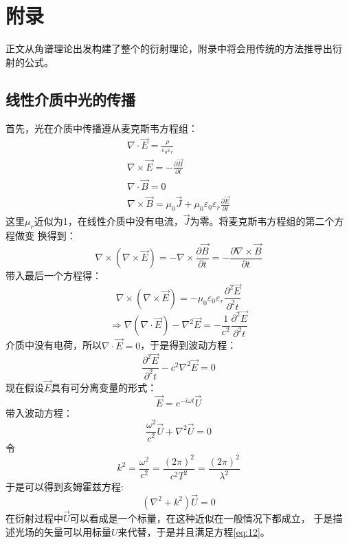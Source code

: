 \documentclass{article}
\begin{document}
\section{附录}
正文从角谱理论出发构建了整个的衍射理论，附录中将会用传统的方法推导出衍
射的公式。
\subsection{线性介质中光的传播}
首先，光在介质中传播遵从麦克斯韦方程组：
\begin{equation}
  \label{eq:11}
  \begin{array}{l}
    \nabla \cdot \vec{E}=\frac{\rho}{\varepsilon_0\varepsilon_{r}}\\
    \nabla \times \vec{E}=-\frac{\partial \vec{B}}{\partial t}\\
    \nabla \cdot \vec{B}=0\\
    \nabla \times \vec{B}=\mu_0\vec{J}+\mu_0\varepsilon_0\varepsilon_r
    \frac{\partial \vec{E}}{\partial t}
  \end{array}
\end{equation}
这里$\mu_r$近似为1，在线性介质中没有电流，$\vec{J}$为零。将麦克斯韦方程组的第二个方程做变
换得到：
\[\nabla \times (\nabla \times \vec{E})=-\nabla\times \frac{\partial
    \vec{B}}{\partial t}=-\frac{\partial \nabla \times
    \vec{B}}{\partial t}\]
带入最后一个方程得：
\[\nabla\times(\nabla\times \vec{E})=-\mu_0\varepsilon_0\varepsilon_r
  \frac{\partial^2\vec{E}}{\partial^2t}\]
\[\Rightarrow \nabla(\nabla\cdot
  \vec{E})-\nabla^2\vec{E}=-\frac{1}{c^2}\frac{\partial^2
    \vec{E}}{\partial^2 t}\]
介质中没有电荷，所以$\nabla\cdot \vec{E}=0$，于是得到波动方程：
\[\frac{\partial^2\vec{E}}{\partial^2t}-c^2\nabla^2\vec{E}=0\]
现在假设$\vec{E}$具有可分离变量的形式：
\[\vec{E}=e^{-i\omega t}\vec{U}\]
带入波动方程：
\[\frac{\omega^2}{c^2}\vec{U}+\nabla^2\vec{U}=0\]
令
\[k^2=\frac{\omega^2}{c^2}=\frac{(2\pi)^2}{c^2T^2}=\frac{(2\pi)^2}{\lambda^2}\]
于是可以得到亥姆霍兹方程:
\begin{equation}
  \label{eq:12}
  (\nabla^2+k^2)\vec{U}=0
\end{equation}
在衍射过程中$\vec{U}$可以看成是一个标量，在这种近似在一般情况下都成立，
于是描述光场的矢量可以用标量$U$来代替，于是并且满足方程\ref{eq:12}。
\end{document}
